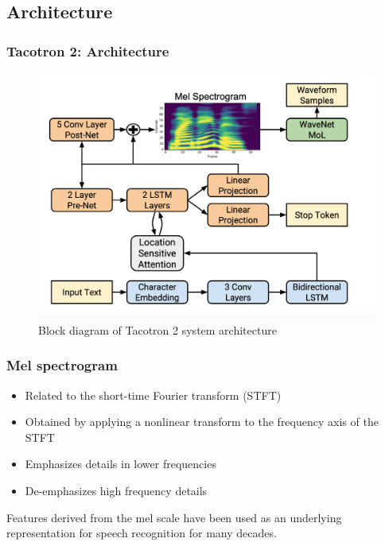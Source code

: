 \documentclass{beamer}
\begin{document}
  \subsection{Architecture}
  \begin{frame}
    \frametitle{Tacotron 2: Architecture}
    \begin{figure}
      \includegraphics[scale=0.25]{images/tacotron_arch.png}
      \caption{Block diagram of Tacotron 2 system architecture}
    \end{figure}
  \end{frame}

  \begin{frame}
    \frametitle{Mel spectrogram}
      \begin{itemize}
        \item Related to the short-time Fourier transform (STFT)
        \item Obtained by applying a nonlinear transform to the frequency axis of the STFT
        \item Emphasizes details in lower frequencies
        \item De-emphasizes high frequency details
      \end{itemize}
      Features derived from the mel scale have been used as an underlying representation for speech recognition for many decades. 
  \end{frame}
\end{document}
